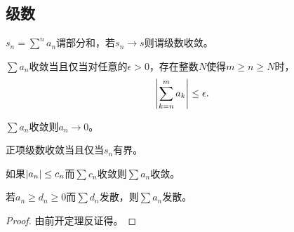 \documentclass{ctexrep}
\begin{document}
  \subsection{级数}
  \begin{definition}
    $s_n=\sum^n a_n$谓部分和，若$s_n\rightarrow s$则谓级数收敛。
  \end{definition}
  \begin{theorem}
    $\sum a_n$收敛当且仅当对任意的$\epsilon>0$，存在整数$N$使得$m\ge n\ge N$时，
    \[ \abs{\sum_{k=n}^m a_k} \le \epsilon. \]
  \end{theorem}
  \begin{theorem}
    $\sum a_n$收敛则$a_n\rightarrow 0$。
  \end{theorem}
  \begin{theorem}
    正项级数收敛当且仅当$s_n$有界。
  \end{theorem}
  \begin{theorem}
    如果$\abs{a_n}\le c_n$而$\sum c_n$收敛则$\sum a_n$收敛。
  \end{theorem}
  \begin{theorem}
    若$a_n\ge d_n \ge 0$而$\sum d_n$发散，则$\sum a_n$发散。
  \end{theorem}
  \begin{proof}
    由前开定理反证得。
  \end{proof}
\end{document}
